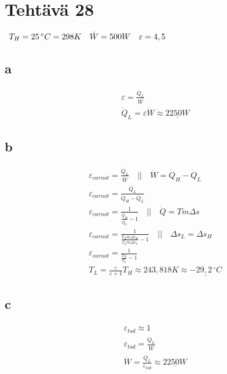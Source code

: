 \documentclass[12pt,a4paper,finnish]{article}
\begin{document}
\section{Tehtävä 28}

\begin{math}
 \begin{array}{l l l}
  T_H = 25 \,^{\circ}C = 298 K & \dot{W} = 500 W & \varepsilon = 4,5
 \end{array}
\end{math}

\subsection{a}

\begin{align}
 &\varepsilon = \frac{\dot{Q}_L}{\dot{W}}\\
 &\dot{Q}_L = \varepsilon \dot{W} \approx \underline{2250W}
\end{align}

\subsection{b}

\begin{align}
 &\varepsilon_{carnot} = \frac{\dot{Q}_L}{\dot{W}} \quad \bigg|\bigg| \quad \dot{W} = \dot{Q}_H - \dot{Q}_L\\
 &\varepsilon_{carnot} = \frac{\dot{Q}_L}{\dot{Q}_H - \dot{Q}_L}\\
 &\varepsilon_{carnot} = \frac{1}{\frac{\dot{Q}_H}{\dot{Q}_L} - 1} \quad \bigg|\bigg| \quad \dot{Q} = T\dot{m}\Delta s\\
 &\varepsilon_{carnot} = \frac{1}{\frac{T_H\dot{m}\Delta s_H}{T_L\dot{m}\Delta s_L} - 1} \quad \bigg|\bigg| \quad 
  \Delta s_L = \Delta s_H\\
 &\varepsilon_{carnot} = \frac{1}{\frac{T_H}{T_L} - 1}\\
 &T_L = \frac{\varepsilon}{\varepsilon + 1}T_H \approx 243,818 K \approx \underline{-29,2 \,^{\circ}C }
\end{align}

\subsection{c}

\begin{align}
 &\varepsilon_{tod} \approx 1\\
 &\varepsilon_{tod} = \frac{\dot{Q}_L}{\dot{W}}\\
 &\dot{W} = \frac{\dot{Q}_L}{\varepsilon_{tod}} \approx \underline{2250W}
\end{align}
\end{document}

